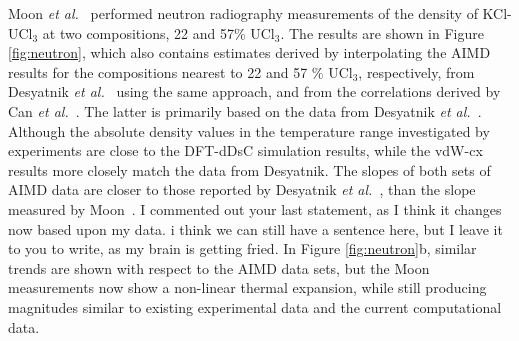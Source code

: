 \documentclass[preprint,3p,10pt,number,sort&compress]{elsarticle}
\begin{document}
Moon \textit{et al.}~\cite{Moon} performed neutron radiography measurements of the density of KCl-UCl$_3$ at two compositions, 22 and 57\% UCl$_3$. The results are shown in Figure \ref{fig:neutron}, which also contains estimates derived by interpolating the AIMD results for the compositions nearest to 22 and 57 \% UCl$_3$, respectively, from Desyatnik \textit{et al.}~\cite{DesyatnikKCl} using the same approach, and from the correlations derived by Can \textit{et al.}~\cite{agca2022}. The latter is primarily based on the data from Desyatnik \textit{et al.}~\cite{DesyatnikKCl}. Although the absolute density values in the temperature range investigated by experiments are close to the DFT-dDsC simulation results, while the vdW-cx results more closely match the data from Desyatnik. The slopes of both sets of AIMD data are closer to those reported by Desyatnik \textit{et al.}~\cite{DesyatnikKCl}, than the slope measured by Moon~\cite{Moon}. 
{\color{red} I commented out your last statement, as I think it changes now based upon my data. i think we can still have a sentence here, but I leave it to you to write, as my brain is getting fried.}
In Figure \ref{fig:neutron}b, similar trends are shown with respect to the AIMD data sets, but the Moon measurements now show a non-linear thermal expansion, while still producing magnitudes similar to existing experimental data and the current computational data. 
\end{document}
